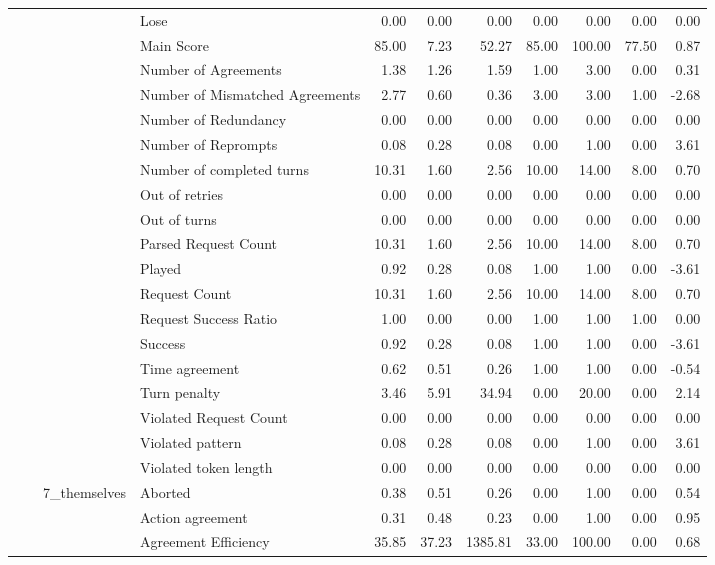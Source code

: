 \begin{tabular}{llllrrrrrrr}
 &  &  & Lose & 0.00 & 0.00 & 0.00 & 0.00 & 0.00 & 0.00 & 0.00 \\
 &  &  & Main Score & 85.00 & 7.23 & 52.27 & 85.00 & 100.00 & 77.50 & 0.87 \\
 &  &  & Number of Agreements & 1.38 & 1.26 & 1.59 & 1.00 & 3.00 & 0.00 & 0.31 \\
 &  &  & Number of Mismatched Agreements & 2.77 & 0.60 & 0.36 & 3.00 & 3.00 & 1.00 & -2.68 \\
 &  &  & Number of Redundancy & 0.00 & 0.00 & 0.00 & 0.00 & 0.00 & 0.00 & 0.00 \\
 &  &  & Number of Reprompts & 0.08 & 0.28 & 0.08 & 0.00 & 1.00 & 0.00 & 3.61 \\
 &  &  & Number of completed turns & 10.31 & 1.60 & 2.56 & 10.00 & 14.00 & 8.00 & 0.70 \\
 &  &  & Out of retries & 0.00 & 0.00 & 0.00 & 0.00 & 0.00 & 0.00 & 0.00 \\
 &  &  & Out of turns & 0.00 & 0.00 & 0.00 & 0.00 & 0.00 & 0.00 & 0.00 \\
 &  &  & Parsed Request Count & 10.31 & 1.60 & 2.56 & 10.00 & 14.00 & 8.00 & 0.70 \\
 &  &  & Played & 0.92 & 0.28 & 0.08 & 1.00 & 1.00 & 0.00 & -3.61 \\
 &  &  & Request Count & 10.31 & 1.60 & 2.56 & 10.00 & 14.00 & 8.00 & 0.70 \\
 &  &  & Request Success Ratio & 1.00 & 0.00 & 0.00 & 1.00 & 1.00 & 1.00 & 0.00 \\
 &  &  & Success & 0.92 & 0.28 & 0.08 & 1.00 & 1.00 & 0.00 & -3.61 \\
 &  &  & Time agreement & 0.62 & 0.51 & 0.26 & 1.00 & 1.00 & 0.00 & -0.54 \\
 &  &  & Turn penalty & 3.46 & 5.91 & 34.94 & 0.00 & 20.00 & 0.00 & 2.14 \\
 &  &  & Violated Request Count & 0.00 & 0.00 & 0.00 & 0.00 & 0.00 & 0.00 & 0.00 \\
 &  &  & Violated pattern & 0.08 & 0.28 & 0.08 & 0.00 & 1.00 & 0.00 & 3.61 \\
 &  &  & Violated token length & 0.00 & 0.00 & 0.00 & 0.00 & 0.00 & 0.00 & 0.00 \\
\cline{3-11}
 &  & \multirow[t]{27}{*}{7_themselves} & Aborted & 0.38 & 0.51 & 0.26 & 0.00 & 1.00 & 0.00 & 0.54 \\
 &  &  & Action agreement & 0.31 & 0.48 & 0.23 & 0.00 & 1.00 & 0.00 & 0.95 \\
 &  &  & Agreement Efficiency & 35.85 & 37.23 & 1385.81 & 33.00 & 100.00 & 0.00 & 0.68 \\

\end{tabular}
